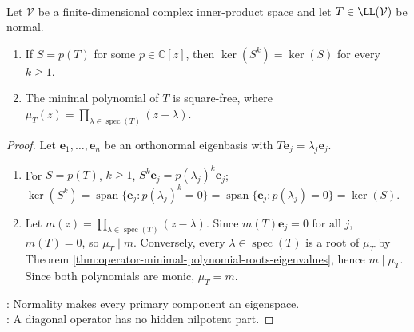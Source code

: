 \begin{corollary} \label{cor:normal-kernels-of-powers-and-squarefree-minimal-polynomial} \\
Let $\mathcal{V}$ be a finite-dimensional complex inner-product space and let $T\in\LL(\mathcal{V})$ be normal.
\begin{enumerate}[label=(\roman*)]
\setlength{\itemsep}{0pt}
\item If $S=p(T)$ for some $p\in\mathbb{C}[z]$, then $\ker(S^k)=\ker(S)$ for every $k\geq1$.
\item The minimal polynomial of $T$ is square-free, where $\mu_T(z)=\prod\limits_{\lambda\in\operatorname{spec}(T)}(z-\lambda)$.
\end{enumerate}
\begin{proof}
Let $\mathbf{e}_1,\ldots,\mathbf{e}_n$ be an orthonormal eigenbasis with $T\mathbf{e}_j=\lambda_j\mathbf{e}_j$.
\begin{enumerate}[label=(\roman*)]
\setlength{\itemsep}{0pt}
\item For $S=p(T)$, $k\geq1$, $S^k\mathbf{e}_j=p(\lambda_j)^k\mathbf{e}_j$; $\ker(S^k)=\operatorname{span}\{\mathbf{e}_j:p(\lambda_j)^k=0\} =\operatorname{span}\{\mathbf{e}_j:p(\lambda_j)=0\} =\ker(S)$.
\item Let $m(z)=\prod_{\lambda\in\operatorname{spec}(T)}(z-\lambda)$. Since $m(T)\mathbf{e}_j=0$ for all $j$, $m(T)=0$, so $\mu_T\mid m$. Conversely, every $\lambda\in\operatorname{spec}(T)$ is a root of $\mu_T$ by Theorem \ref{thm:operator-minimal-polynomial-roots-eigenvalues}, hence $m\mid\mu_T$. Since both polynomials are monic, $\mu_T=m$.
\end{enumerate}
: Normality makes every primary component an eigenspace.\\
: A diagonal operator has no hidden nilpotent part.
\end{proof}
\end{corollary}

